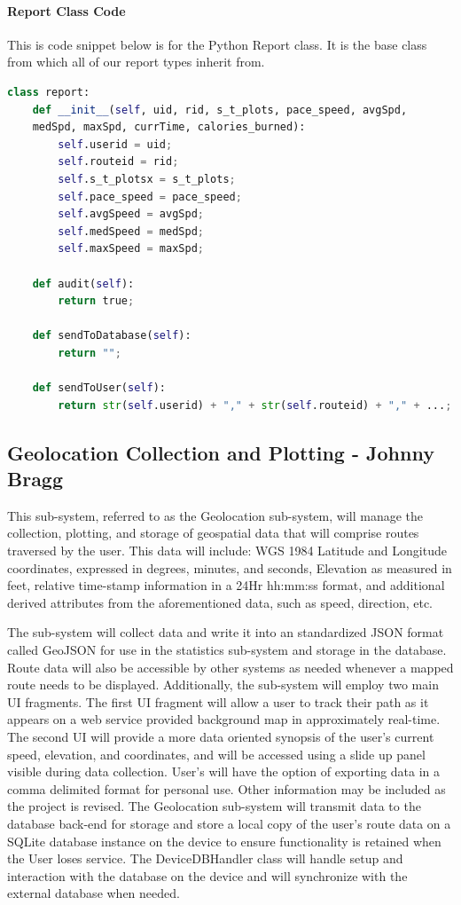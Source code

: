 ﻿\documentclass{article}
\begin{document}
\paragraph{Report Class Code}
This is code snippet below is for the Python Report class. It is the base class from which all of our report types inherit from.
\begin{lstlisting}[language=Python]
class report:
    def __init__(self, uid, rid, s_t_plots, pace_speed, avgSpd,
    medSpd, maxSpd, currTime, calories_burned):
        self.userid = uid;
        self.routeid = rid;
        self.s_t_plotsx = s_t_plots;
        self.pace_speed = pace_speed;
        self.avgSpeed = avgSpd;
        self.medSpeed = medSpd;
        self.maxSpeed = maxSpd;

    def audit(self):
        return true;

    def sendToDatabase(self):
        return "";

    def sendToUser(self):
        return str(self.userid) + "," + str(self.routeid) + "," + ...;
\end{lstlisting}



\subsection{Geolocation Collection and Plotting - Johnny Bragg}
This sub-system, referred to as the Geolocation sub-system, will manage the collection, plotting, and storage of geospatial data that will comprise routes traversed by the user. This data will include: WGS 1984 Latitude and Longitude coordinates, expressed in degrees, minutes, and seconds, Elevation as measured in feet, relative time-stamp information in a 24Hr hh:mm:ss format, and additional derived attributes from the aforementioned data, such as speed, direction, etc.

The sub-system will collect data and write it into an standardized JSON format called GeoJSON for use in the statistics sub-system and storage in the database. Route data will also be accessible by other systems as needed whenever a mapped route needs to be displayed. Additionally, the sub-system will employ two main UI fragments. The first UI fragment will allow a user to track their path as it appears on a web service provided background map in approximately real-time. The second UI will provide a more data oriented synopsis of the user’s current speed, elevation, and coordinates, and will be accessed using a slide up panel visible during data collection. User’s will have the option of exporting data in a comma delimited format for personal use. Other information may be included as the project is revised. The Geolocation sub-system will transmit data to the database back-end for storage and store a local copy of the user's route data on a SQLite database instance on the device to ensure functionality is retained when the User loses service. The DeviceDBHandler class will handle setup and interaction with the database on the device and will synchronize with the external database when needed.
\end{document}

